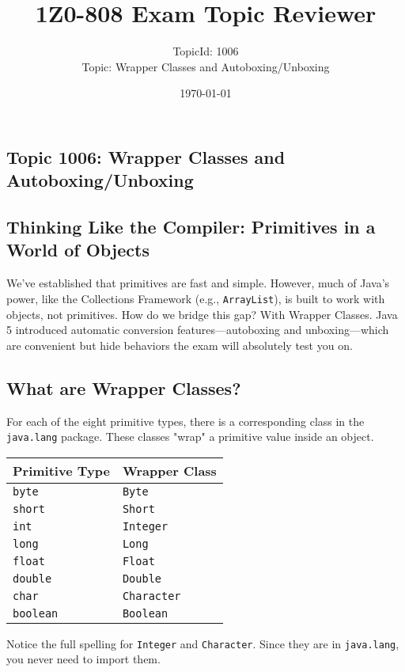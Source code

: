 \documentclass[12pt]{article}
\title{\textbf{1Z0-808 Exam Topic Reviewer}}
\author{TopicId: 1006 \\ Topic: Wrapper Classes and Autoboxing/Unboxing}
\date{\today}
\begin{document}
\maketitle
\newpage\begin{enumerate}[label=(\arabic*)]
\section*{Topic 1006: Wrapper Classes and Autoboxing/Unboxing}

\subsection*{Thinking Like the Compiler: Primitives in a World of Objects}
We've established that primitives are fast and simple. However, much of Java's power, like the Collections Framework (e.g., \texttt{ArrayList}), is built to work with objects, not primitives. How do we bridge this gap? With Wrapper Classes. Java 5 introduced automatic conversion features—autoboxing and unboxing—which are convenient but hide behaviors the exam will absolutely test you on.

\subsection*{What are Wrapper Classes?}
For each of the eight primitive types, there is a corresponding class in the \texttt{java.lang} package. These classes "wrap" a primitive value inside an object.

\begin{tabular}{|l|l|}
\hline
\textbf{Primitive Type} & \textbf{Wrapper Class} \\
\hline
\texttt{byte} & \texttt{Byte} \\
\texttt{short} & \texttt{Short} \\
\texttt{int} & \texttt{Integer} \\
\texttt{long} & \texttt{Long} \\
\texttt{float} & \texttt{Float} \\
\texttt{double} & \texttt{Double} \\
\texttt{char} & \texttt{Character} \\
\texttt{boolean} & \texttt{Boolean} \\
\hline
\end{tabular}

Notice the full spelling for \texttt{Integer} and \texttt{Character}. Since they are in \texttt{java.lang}, you never need to import them.


\end{enumerate}
\end{document}
